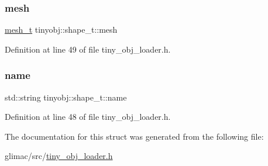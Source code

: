 \subsubsection{\texorpdfstring{mesh}{mesh}}
{\footnotesize\ttfamily \hyperlink{structtinyobj_1_1mesh__t}{mesh\+\_\+t} tinyobj\+::shape\+\_\+t\+::mesh}



Definition at line 49 of file tiny\+\_\+obj\+\_\+loader.\+h.

\mbox{\label{structtinyobj_1_1shape__t_a98650e2e66d00934f68de88eafb34630}} 
\subsubsection{\texorpdfstring{name}{name}}
{\footnotesize\ttfamily std\+::string tinyobj\+::shape\+\_\+t\+::name}



Definition at line 48 of file tiny\+\_\+obj\+\_\+loader.\+h.



The documentation for this struct was generated from the following file\+:\begin{DoxyCompactItemize}
\item 
glimac/src/\hyperlink{tiny__obj__loader_8h}{tiny\+\_\+obj\+\_\+loader.\+h}\end{DoxyCompactItemize}
